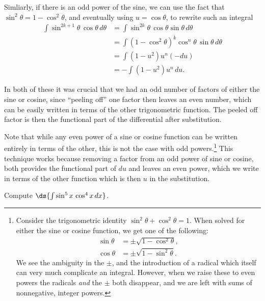 Simliarly, if there is an odd power of the sine, we can
use the fact that $\sin^2\theta=1-\cos^2\theta$,
and eventually using $u=\cos\theta$, to 
rewrite such an integral
\begin{align*}
\int\sin^{2k+1}\theta\,\cos\theta\,d\theta&=\int\sin^{2k}\theta\,\cos\theta
                       \sin\theta\,d\theta\\
  &=\int\left(1-\cos^2\theta\right)^k\cos^n\theta\,\sin\theta\,d\theta\\
  &=\int\left(1-u^2\right)u^n(-du)\\
  &=-\int\left(1-u^2\right)u^n\,du.
\end{align*}

In both of these it was crucial that we had an odd number of
factors of either the sine or cosine, since ``peeling off''
one factor then leaves an even number, which can be
easily written in terms of the other trigonometric function.
The peeled off factor is then the functional part of the differential
after substitution.

Note that while
any even power of a sine or cosine function can be written
entirely in terms of  the other, this is not the
case with odd powers.\footnote{%
Consider the trigonometric identity $\sin^2\theta+\cos^2\theta=1$.
When solved for either the sine or cosine function, we
get one of the following:
\begin{align*}
\sin\theta&=\pm\sqrt{1-\cos^2\theta},\\
\cos\theta&=\pm\sqrt{1-\sin^2\theta}.\end{align*}
We see the ambiguity in the $\pm$, and the introduction of a radical
which itself can very much complicate an integral.
However, when we raise these to 
even powers the radicals {\it and} the $\pm$ both 
disappear, and we are left with sums of nonnegative, integer powers.
}
This technique works because
removing a factor from an odd power of sine or cosine,
both provides the functional part of $du$ and leaves an even power,
which we write in terms of the other function which is then $u$
in the substitution.

\bex Compute $\ds{\int\sin^5x\,\cos^4x\,dx}$.

